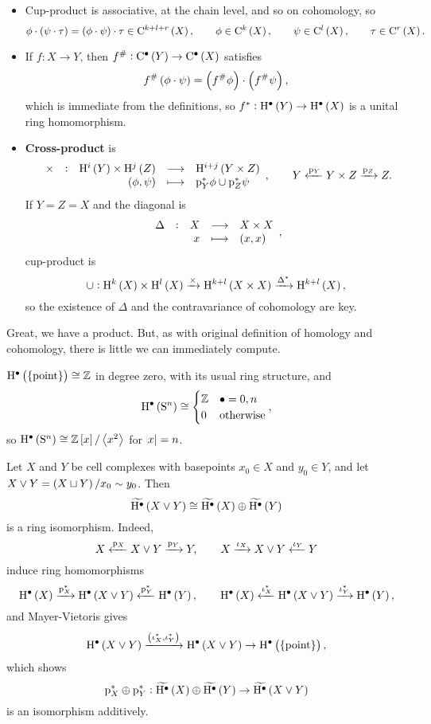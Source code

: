 \begin{proposition}
\hfill
\begin{itemize}
\item Cup-product is associative, at the chain level, and so on cohomology, so
$$ \phi \cdot \br{\psi \cdot \tau} = \br{\phi \cdot \psi} \cdot \tau \in \C^{k + l + r}\br{X}, \qquad \phi \in \C^k\br{X}, \qquad \psi \in \C^l\br{X}, \qquad \tau \in \C^r\br{X}. $$
\item If $ f : X \to Y $, then $ f^\# : \C^\bullet\br{Y} \to \C^\bullet\br{X} $ satisfies
$$ f^\#\br{\phi \cdot \psi} = \br{f^\#\phi} \cdot \br{f^\#\psi}, $$
which is immediate from the definitions, so $ f^* : \H^\bullet\br{Y} \to \H^\bullet\br{X} $ is a unital ring homomorphism.
\item \textbf{Cross-product} is
$$ \function[\times]{\H^i\br{Y} \times \H^j\br{Z}}{\H^{i + j}\br{Y \times Z}}{\br{\phi, \psi}}{\p_Y^*\phi \cup \p_Z^*\psi}, \qquad Y \xleftarrow{\p_Y} Y \times Z \xrightarrow{\p_Z} Z. $$
If $ Y = Z = X $ and the diagonal is
$$ \function[\Delta]{X}{X \times X}{x}{\br{x, x}}, $$
cup-product is
$$ \cup : \H^k\br{X} \times \H^l\br{X} \xrightarrow{\times} \H^{k + l}\br{X \times X} \xrightarrow{\Delta^*} \H^{k + l}\br{X}, $$
so the existence of $ \Delta $ and the contravariance of cohomology are key.
\end{itemize}
\end{proposition}

Great, we have a product. But, as with original definition of homology and cohomology, there is little we can immediately compute.

\begin{example*}
$ \H^\bullet\br{\pt} \cong \ZZ $ in degree zero, with its usual ring structure, and
$$ \H^\bullet\br{\S^n} \cong
\begin{cases}
\ZZ & \bullet = 0, n \\
0 & \text{otherwise}
\end{cases},
$$
so $ \H^\bullet\br{\S^n} \cong \ZZ\sbr{x} / \abr{x^2} $ for $ \abs{x} = n $.
\end{example*}

\begin{example*}
Let $ X $ and $ Y $ be cell complexes with basepoints $ x_0 \in X $ and $ y_0 \in Y $, and let $ X \vee Y = \br{X \sqcup Y} / x_0 \sim y_0 $. Then
$$ \widetilde{\H^\bullet}\br{X \vee Y} \cong \widetilde{\H^\bullet}\br{X} \oplus \widetilde{\H^\bullet}\br{Y} $$
is a ring isomorphism. Indeed,
$$ X \xleftarrow{\mathrm{p}_X} X \vee Y \xrightarrow{\mathrm{p}_Y} Y, \qquad X \xrightarrow{\iota_X} X \vee Y \xleftarrow{\iota_Y} Y $$
induce ring homomorphisms
$$ \H^\bullet\br{X} \xrightarrow{\p_X^*} \H^\bullet\br{X \vee Y} \xleftarrow{\p_Y^*} \H^\bullet\br{Y}, \qquad \H^\bullet\br{X} \xleftarrow{\iota_X^*} \H^\bullet\br{X \vee Y} \xrightarrow{\iota_Y^*} \H^\bullet\br{Y}, $$
and Mayer-Vietoris gives
$$ \H^\bullet\br{X \vee Y} \xrightarrow{\br{\iota_X^*, \iota_Y^*}} \H^\bullet\br{X \vee Y} \to \H^\bullet\br{\pt}, $$
which shows
$$ \p_X^* \oplus \p_Y^* : \widetilde{\H^\bullet}\br{X} \oplus \widetilde{\H^\bullet}\br{Y} \to \widetilde{\H^\bullet}\br{X \vee Y} $$
is an isomorphism additively.
\end{example*}

